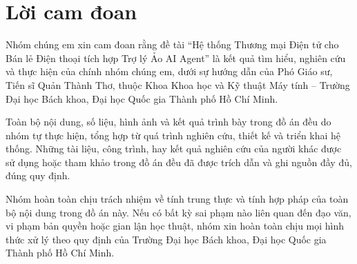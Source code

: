 \section*{Lời cam đoan}
\thispagestyle{empty}

Nhóm chúng em xin cam đoan rằng đề tài “Hệ thống Thương mại Điện tử cho Bán lẻ Điện thoại tích hợp Trợ lý Ảo AI Agent” là kết quả tìm hiểu, nghiên cứu và thực hiện của chính nhóm chúng em, dưới sự hướng dẫn của Phó Giáo sư, Tiến sĩ Quản Thành Thơ, thuộc Khoa Khoa học và Kỹ thuật Máy tính – Trường Đại học Bách khoa, Đại học Quốc gia Thành phố Hồ Chí Minh.

Toàn bộ nội dung, số liệu, hình ảnh và kết quả trình bày trong đồ án đều do nhóm tự thực hiện, tổng hợp từ quá trình nghiên cứu, thiết kế và triển khai hệ thống. Những tài liệu, công trình, hay kết quả nghiên cứu của người khác được sử dụng hoặc tham khảo trong đồ án đều đã được trích dẫn và ghi nguồn đầy đủ, đúng quy định.

Nhóm hoàn toàn chịu trách nhiệm về tính trung thực và tính hợp pháp của toàn bộ nội dung trong đồ án này. Nếu có bất kỳ sai phạm nào liên quan đến đạo văn, vi phạm bản quyền hoặc gian lận học thuật, nhóm xin hoàn toàn chịu mọi hình thức xử lý theo quy định của Trường Đại học Bách khoa, Đại học Quốc gia Thành phố Hồ Chí Minh.
\clearpage
{}

